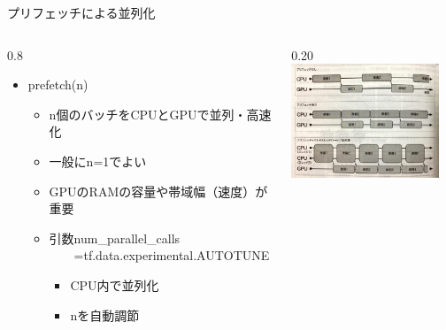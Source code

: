 \documentclass[aspectratio=169, dvipdfmx, 14pt, xcolor={svgnames,dvipsnames}, t]{beamer}
\newlength{\mytotalwidth}
\newlength{\mycolumnwidth}
\begin{document}
\begin{frame}{プリフェッチによる並列化}

  \begin{columns}[totalwidth=\mytotalwidth]
    \begin{column}[t]{0.8\mycolumnwidth}

      \begin{itemize}
        \tightlist
        \item
              prefetch(n)

              \begin{itemize}
                \tightlist
                \item
                      \alert{n個のバッチをCPUとGPUで並列・高速化}
                \item
                      一般にn=1でよい
                \item
                      GPUのRAMの容量や帯域幅（速度）が重要
                \item
                      引数num\_parallel\_calls\\　　=tf.data.experimental.AUTOTUNE

                      \begin{itemize}
                        \tightlist
                        \item
                              CPU内で並列化
                        \item
                              nを自動調節
                      \end{itemize}
              \end{itemize}
      \end{itemize}

    \end{column}
    \begin{column}[T]{0.20\mycolumnwidth}
      \includegraphics[width=125pt]{img/hands-on-ml_13-1-5_1.jpg}
    \end{column}
  \end{columns}

\end{frame}
\end{document}
